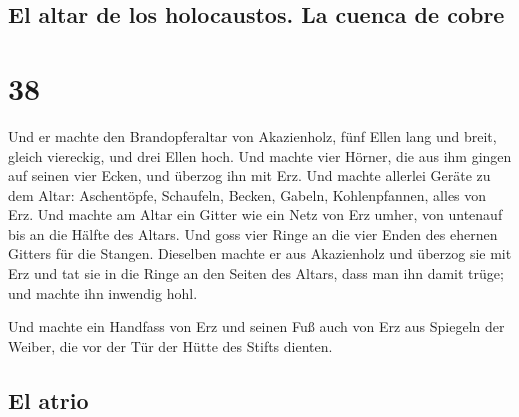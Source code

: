 \hypertarget{el-altar-de-los-holocaustos.-la-cuenca-de-cobre}{%
\subsection{El altar de los holocaustos. La cuenca de
cobre}\label{el-altar-de-los-holocaustos.-la-cuenca-de-cobre}}

\hypertarget{section-37}{%
\section{38}\label{section-37}}

 Und er machte den Brandopferaltar von Akazienholz, fünf
Ellen lang und breit, gleich viereckig, und drei Ellen hoch.
 Und machte vier Hörner, die aus ihm gingen auf seinen
vier Ecken, und überzog ihn mit Erz.  Und machte allerlei
Geräte zu dem Altar: Aschentöpfe, Schaufeln, Becken, Gabeln,
Kohlenpfannen, alles von Erz.  Und machte am Altar ein
Gitter wie ein Netz von Erz umher, von untenauf bis an die Hälfte des
Altars.  Und goss vier Ringe an die vier Enden des ehernen
Gitters für die Stangen.  Dieselben machte er aus
Akazienholz und überzog sie mit Erz  und tat sie in die
Ringe an den Seiten des Altars, dass man ihn damit trüge; und machte ihn
inwendig hohl.

 Und machte ein Handfass von Erz und seinen Fuß auch von
Erz aus Spiegeln der Weiber, die vor der Tür der Hütte des Stifts
dienten.

\hypertarget{el-atrio}{%
\subsection{El atrio}\label{el-atrio}}


